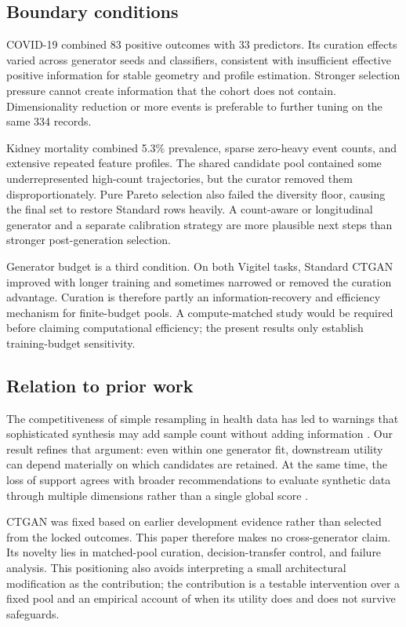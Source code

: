 \subsection{Boundary conditions}

COVID-19 combined 83 positive outcomes with 33 predictors. Its curation effects varied across generator seeds and classifiers, consistent with insufficient effective positive information for stable geometry and profile estimation. Stronger selection pressure cannot create information that the cohort does not contain. Dimensionality reduction or more events is preferable to further tuning on the same 334 records.

Kidney mortality combined 5.3\% prevalence, sparse zero-heavy event counts, and extensive repeated feature profiles. The shared candidate pool contained some underrepresented high-count trajectories, but the curator removed them disproportionately. Pure Pareto selection also failed the diversity floor, causing the final set to restore Standard rows heavily. A count-aware or longitudinal generator and a separate calibration strategy are more plausible next steps than stronger post-generation selection.

Generator budget is a third condition. On both Vigitel tasks, Standard CTGAN improved with longer training and sometimes narrowed or removed the curation advantage. Curation is therefore partly an information-recovery and efficiency mechanism for finite-budget pools. A compute-matched study would be required before claiming computational efficiency; the present results only establish training-budget sensitivity.

\subsection{Relation to prior work}

The competitiveness of simple resampling in health data has led to warnings that sophisticated synthesis may add sample count without adding information \citep{huetdastarac2026}. Our result refines that argument: even within one generator fit, downstream utility can depend materially on which candidates are retained. At the same time, the loss of support agrees with broader recommendations to evaluate synthetic data through multiple dimensions rather than a single global score \citep{hernandez2025,nanevski2026}.

CTGAN was fixed based on earlier development evidence rather than selected from the locked outcomes. This paper therefore makes no cross-generator claim. Its novelty lies in matched-pool curation, decision-transfer control, and failure analysis. This positioning also avoids interpreting a small architectural modification as the contribution; the contribution is a testable intervention over a fixed pool and an empirical account of when its utility does and does not survive safeguards.

